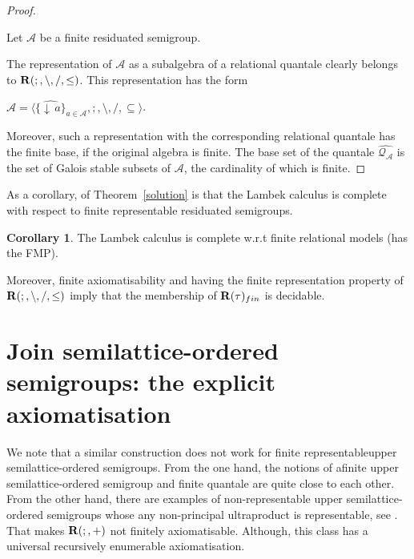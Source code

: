 \documentclass[a4paper]{article}
\theoremstyle{definition}
\theoremstyle{theorem}
\theoremstyle{proposition}
\theoremstyle{lemma}
\theoremstyle{ex}
\theoremstyle{corollary}
\newtheorem{corollary}{Corollary}
\theoremstyle{claim}
\newcommand{\down}[1]{\ensuremath{{\downarrow}\,#1}}
\begin{document}
\begin{proof}
  $ $

  Let $\mathcal{A}$ be a finite residuated semigroup.

  The representation of $\mathcal{A}$ as a subalgebra of a relational quantale clearly belongs to ${\bf R}(;, \setminus, /, \leq)$. This representation has the form

\begin{center}
  $\widehat{\mathcal{A}} = \langle \{ \widehat{\down{a}} \}_{a \in \mathcal{A}}, ;, \setminus, /, \subseteq \rangle$.
\end{center}

  Moreover, such a representation with the corresponding relational quantale has the finite base, if the original algebra is finite. The base set of the quantale $\widehat{\mathcal{Q}_{\mathcal{A}}}$ is the set of Galois stable subsets of $\mathcal{A}$, the cardinality of which is finite.
\end{proof}

As a corollary, of Theorem~\ref{solution} is that the Lambek calculus is complete with respect to finite representable residuated semigroups.

\begin{corollary} \label{fmp}
  The Lambek calculus is complete w.r.t finite relational models (has the FMP).
\end{corollary}

Moreover, finite axiomatisability and having the finite representation property of ${\bf R}(;, \setminus, /, \leq)$ imply that the membership of ${\bf R}(\tau)_{fin}$ is decidable.

\section{Join semilattice-ordered semigroups: the explicit axiomatisation}

We  note  that  a  similar  construction  does  not  work  for  finite  representableupper semilattice-ordered semigroups. From the one hand, the notions of afinite upper semilattice-ordered semigroup and finite quantale are quite close to each other. From the other hand, there are examples of non-representable upper semilattice-ordered semigroups whose any non-principal ultraproduct is representable, see \cite[Theorem 3.1]{andreka2011axiomatizability}. That makes ${\bf R}(;,+)$ not finitely axiomatisable. Although, this class has a universal recursively enumerable axiomatisation.
\end{document}
